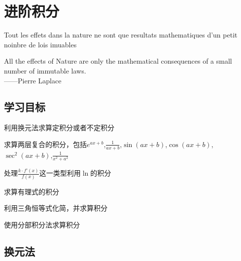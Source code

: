 \chapter{进阶积分}
Tout les effets dans la nature ne sont que resultats mathematiques d’un petit noinbre de lois imuables
\par
All the effects of Nature are only the mathematical consequences of a small number of immutable laws. \\
\makebox{}\hfill——Pierre Laplace

\section*{学习目标}
\begin{todolist}
 \item 利用换元法求算定积分或者不定积分
 \item 求算两层复合的积分，包括$e^{ax+b}$,$\frac{1}{ax+b}$,$\sin({ax+b})$,$\cos({ax+b})$,$\sec^2({ax+b})$,$\frac{1}{x^2+a^2}$
 \item 处理$\frac{k\cdot f'(x)}{f(x)}$这一类型利用$\ln$的积分
 \item 求算有理式的积分
 \item 利用三角恒等式化简，并求算积分
 \item 使用分部积分法求算积分
\end{todolist}
\clearpage

\section{换元法}

